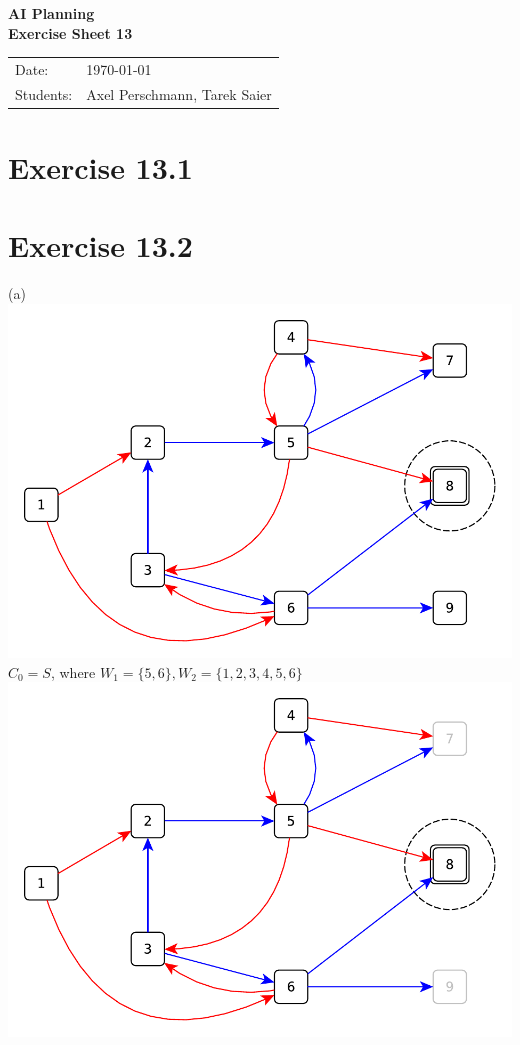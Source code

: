 \documentclass[11pt,a4paper]{article}
\newcommand{\sheetNr}{13}
\begin{document}
\begin{center}
\Huge{\textbf{AI Planning}}\\
\LARGE{\textbf{Exercise Sheet \sheetNr}}
\end{center}
\vspace{2cm}
\begin{tabular}{ll}
Date: & \today\\
Students: & Axel Perschmann, Tarek Saier
\end{tabular}

\section*{Exercise 13.1}

\section*{Exercise 13.2}
(a)\\
\includegraphics[scale=0.4]{13_2_0.pdf}\\
$C_0=S$, where $W_1=\{5,6\},W_2=\{1,2,3,4,5,6\}$\\
\includegraphics[scale=0.4]{13_2_1.pdf}\\
\end{document}
